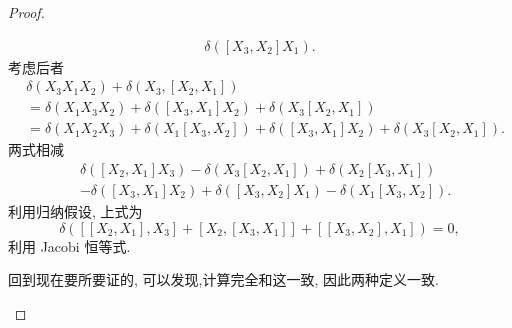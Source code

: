 \begin{proof}
\begin{itemize}
\begin{align*}
        \delta([X_3, X_2]X_1).
      \end{align*}
      考虑后者
      \begin{align*}
        &\delta(X_3 X_1X_2) + \delta(X_3, [X_2, X_1])\\
        &= \delta(X_1 X_3 X_2) + \delta([X_3, X_1]X_2) + \delta(X_3[X_2, X_1])\\
        & = \delta(X_1X_2X_3) + \delta(X_1[X_3, X_2]) + \delta([X_3, X_1]X_2) +
        \delta(X_3[X_2,X_1]).
      \end{align*}
      两式相减
      \begin{align*}
        &\delta([X_2, X_1]X_3) - \delta(X_3[X_2, X_1]) + \delta(X_2[X_3, X_1])
      \\&-\delta([X_3, X_1]X_2) + \delta([X_3, X_2]X_1) - \delta(X_1[X_3, X_2]).
      \end{align*}
      利用归纳假设, 上式为
      \[
        \delta([[X_2, X_1], X_3] +[X_2, [X_3, X_1]] + [[X_3, X_2], X_1]) = 0,
      \]
      利用 Jacobi 恒等式.

      回到现在要所要证的, 可以发现,计算完全和这一致, 因此两种定义一致.
  \end{itemize}

\end{proof}

